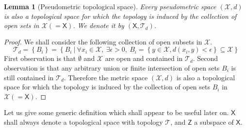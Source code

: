 \documentclass[10pt]{book}
\newcommand{\Tcal}{\mathcal{T}}
\newcommand{\Xcal}{\mathcal{X}}
\newcommand{\Xsf}{\mathsf{X}}
\newcommand{\Zsf}{\mathsf{Z}}
\theoremstyle{break}
\newtheorem{lemma}{Lemma}
\newtheorem{proof}{Proof}
\begin{document}
\begin{lemma}[Pseudometric topological space]
Every pseudometric space $(\Xcal,d)$ is also a topological space for which the topology is induced by the collection of open sets in $\Xcal(=\Xsf)$. We denote it by $(\Xsf,\Tcal_d)$.
\end{lemma}


\begin{proof}
We shall consider the following collection of open subsets in $\Xcal$.
%
\begin{equation*}
\Tcal_d = \left\{ B_i \right\} = \left\{B_i \ \bigg| \ \forall x_i \in \Xcal , \ \exists \epsilon > 0, \ B_i = \left\{ y \in \Xcal , d(x_i,y) < \epsilon \right\} \subseteq \Xcal \right\} 
\end{equation*}
%
First observation is that $\emptyset$ and $\Xcal$ are open and contained in $\Tcal_d$. Second observation is that any arbitrary union or finite intersection of open sets $B_i$ is still contained in $\Tcal_d$. Therefore the metric space $(\Xcal,d)$ is also a topological space for which the topology is induced by the collection of open sets $B_i$ in $\Xcal(=\Xsf)$.
\end{proof}


Let us give some generic definition which shall appear to be useful later on. $\Xsf$ shall always denote a topological space with topology $\Tcal$, and $\Zsf$ a subspace of $\Xsf$.%
\end{document}
